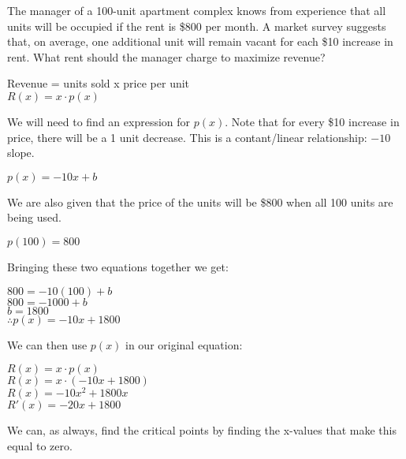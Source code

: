 \documentclass[12pt,fleqn]{book} %
\begin{document}
\vspace*{5mm}


\noindent\small{The manager of a 100-unit apartment complex knows from experience that all units will be occupied if the rent is \$800 per month. A market survey suggests
    that, on average, one additional unit will remain vacant for each \$10 increase in rent. What rent should the manager charge to maximize revenue?}

\begin{center}
    Revenue = units sold x price per unit \\
    $R(x) = x \cdot p(x)$
\end{center}

\noindent We will need to find an expression for $p(x)$. Note that for every \$10 increase in price, there will be a 1 unit decrease. This is a contant/linear relationship: $-10$ slope.

\begin{center}
    $p(x) = -10x + b$
\end{center}

\noindent We are also given that the price of the units will be \$800 when all 100 units are being used.

\begin{center}
    $p(100)=800$
\end{center}

\noindent Bringing these two equations together we get:

\begin{center}
    $800=-10(100)+b$ \\
    $800=-1000+b$ \\
    $b=1800$ \\
    $\therefore p(x)=-10x+1800$
\end{center}

\noindent We can then use $p(x)$ in our original equation:

\begin{center}
    $R(x) = x \cdot p(x)$ \\
    $R(x)=x \cdot (-10x+1800)$ \\
    $R(x)=-10x^2+1800x$ \\
    $R'(x)=-20x+1800$
\end{center}

\noindent We can, as always, find the critical points by finding the x-values that make this equal to zero.
\end{document}
